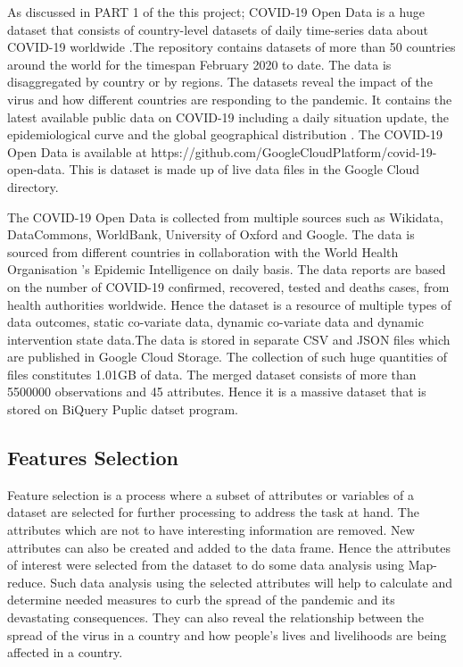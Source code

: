 \documentclass[12pt,letterpaper, twoside]{article}
\begin{document}
 As discussed in PART 1 of the this project;  COVID-19 Open Data is a huge dataset that consists of country-level datasets of daily time-series data about COVID-19 worldwide \cite{covid-19}.The repository contains datasets of more than 50 countries around the world for the timespan February 2020 to date. The data is disaggregated  by country or by regions. The datasets reveal the impact of the virus and how different countries are responding to the pandemic.  It contains the latest available public data on COVID-19 including a daily situation update, the epidemiological curve and the global geographical distribution \cite{covid-19}. The COVID-19 Open Data is available at https://github.com/GoogleCloudPlatform/covid-19-open-data. This is dataset is made up of live data files in the Google Cloud directory.

The COVID-19 Open Data is collected from multiple sources such as Wikidata, DataCommons, WorldBank, University of Oxford and Google. The data is sourced from different countries in collaboration with the World Health Organisation 's Epidemic Intelligence on daily basis. The data reports are based on the number of COVID-19  confirmed, recovered, tested and deaths cases, from health authorities worldwide. Hence the dataset is a resource of multiple types of data outcomes, static co-variate data, dynamic co-variate data and dynamic intervention state data\cite{covid-19}.The data is stored in separate CSV and JSON files which are published in Google Cloud Storage. The collection of such huge quantities of files constitutes 1.01GB of data.  The merged dataset consists of more than 5500000 observations and 45 attributes. Hence it is a massive dataset that is stored on BiQuery Puplic datset program.

\subsection{Features Selection}
Feature selection is a process where a subset of attributes or variables of a dataset are selected for further processing to address the task at hand. The attributes which are  not to have interesting information are removed. New  attributes can also be created and added to the data frame. Hence the  attributes  of interest were selected from the dataset  to do some data analysis using Map-reduce.  Such data analysis using the selected attributes will help to calculate and determine needed measures to curb the spread of the pandemic and its devastating consequences. They can also reveal the relationship between the spread of the virus in a country and how people's lives and livelihoods are being affected in a country.
\end{document}
